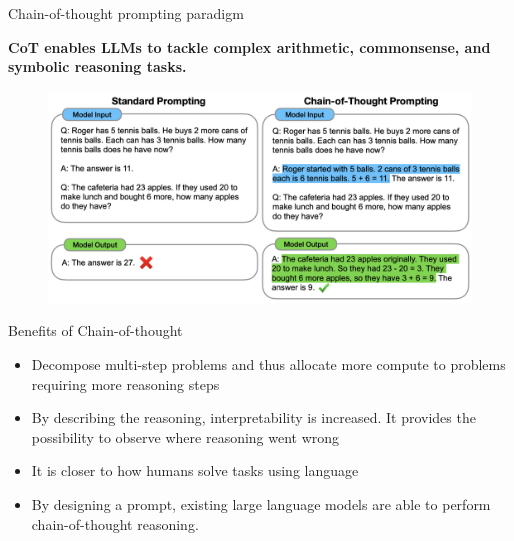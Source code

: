
\begin{vbframe}{Chain-of-thought prompting paradigm}

\vfill

\textbf{CoT enables LLMs to tackle complex arithmetic, commonsense, and symbolic reasoning tasks.}

\begin{figure}
    \centering
    \includegraphics{figure/chain_of_thought.png}\\
\end{figure}

\vfill

\end{vbframe}


\begin{vbframe}{Benefits of Chain-of-thought}

\vfill

\begin{itemize}
    \item Decompose multi-step problems and thus allocate more compute to problems requiring more reasoning steps
    \item By describing the reasoning, interpretability is increased. It provides the possibility to observe where reasoning went wrong
    \item It is closer to how humans solve tasks using language
    \item By designing a prompt, existing large language models are able to perform chain-of-thought reasoning.
\end{itemize}

\vfill

\end{vbframe}

